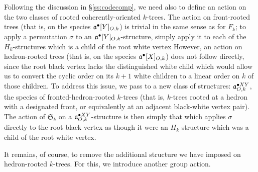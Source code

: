 \documentclass[sectionflow,singlespace,twoside,boldmathhdr]{brandiss} %
\numberwithin{section}{chapter}
\numberwithin{figure}{chapter}
\begin{document}
Following the discussion in \S \ref{ss:codecomp}, we need also to define an action on the two classes of rooted coherently-oriented $k$-trees.
The action on front-rooted trees (that is, on the species $\pointed{\mathfrak{a}}[Y]_{O, k}$) is trivial in the same sense as for $F_{k}$; to apply a permutation $\sigma$ to an $\pointed{\mathfrak{a}}[Y]_{O, k}$-structure, simply apply it to each of the $H_{k}$-structures which is a child of the root white vertex
However, an action on hedron-rooted trees (that is, on the species $\pointed{\mathfrak{a}}[X]_{O, k}$) does not follow directly, since the root black vertex lacks the distinguished white child which would allow us to convert the cyclic order on its $k+1$ white children to a linear order on $k$ of those children.
To address this issue, we pass to a new class of structures: $\pointed[XY]{\mathfrak{a}}_{O, k}$, the species of fronted-hedron-rooted $k$-trees (that is, $k$-trees rooted at a hedron with a designated front, or equivalently at an adjacent black-white vertex pair).
The action of $\mathfrak{S}_{k}$ on a $\pointed[XY]{\mathfrak{a}}_{O, k}$-structure is then simply that which applies $\sigma$ directly to the root black vertex as though it were an $H_{k}$ structure which was a child of the root white vertex.

It remains, of course, to remove the additional structure we have imposed on hedron-rooted $k$-trees.
For this, we introduce another group action.
\end{document}
